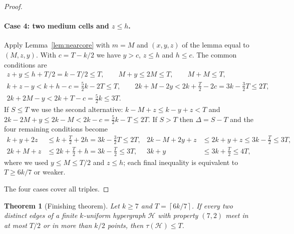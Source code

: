 \documentclass[11pt]{article}
\numberwithin{equation}{section}
\newtheorem{theorem}{Theorem}[section]
\theoremstyle{definition}
\theoremstyle{remark}
\newcommand{\HH}{\mathcal H}
\newcommand{\ceil}[1]{\left\lceil #1\right\rceil}
\begin{document}
\begin{proof}
\paragraph{Case 4: two medium cells and $z\le h$.}
Apply Lemma~\ref{lem:nearcore} with $m=M$ and $(x,y,z)$ of the lemma equal
to $(M,z,y)$. With $c=T-k/2$ we have $y>c$, $z\le h$ and $h\le c$. The
common conditions are
\begin{gather*}
 z+y\le h+T/2=k-T/2\le T,\qquad M+y\le2M\le T,\qquad M+M\le T,\\
 k+z-y<k+h-c=\tfrac52k-2T\le T,\qquad
 2k+M-2y<2k+\tfrac T2-2c=3k-\tfrac32T\le2T,\\
 2k+2M-y<2k+T-c=\tfrac52k\le3T .
\end{gather*}
If $S\le T$ we use the second alternative:
$k-M+z\le k-y+z<T$ and $2k-2M+y\le2k-M<2k-c=\tfrac52k-T\le2T$. If $S>T$
then $\Delta=S-T$ and the four remaining conditions become
\begin{align*}
 k+y+2z&\le k+\tfrac T2+2h=3k-\tfrac32T\le2T,&
 2k-M+2y+z&\le2k+y+z\le3k-\tfrac T2\le3T,\\
 2k+M+z&\le2k+\tfrac T2+h=3k-\tfrac T2\le3T,&
 3k+y&\le3k+\tfrac T2\le4T,
\end{align*}
where we used $y\le M\le T/2$ and $z\le h$; each final inequality is
equivalent to $T\ge6k/7$ or weaker.

The four cases cover all triples.
\end{proof}

\begin{theorem}[Finishing theorem]\label{thm:finish}
Let $k\ge7$ and $T=\ceil{6k/7}$. If every two distinct edges of a finite
$k$-uniform hypergraph $\HH$ with property $(7,2)$ meet in at most $T/2$
or in more than $k/2$ points, then $\tau(\HH)\le T$.
\end{theorem}
\end{document}
